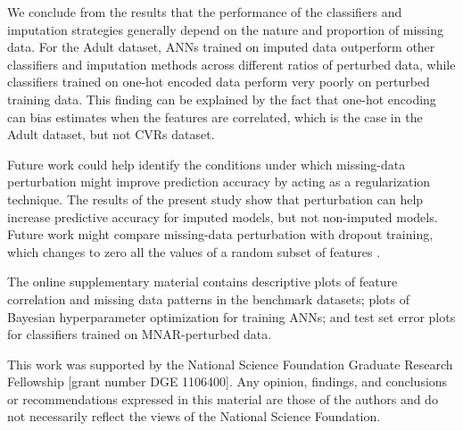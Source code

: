 \documentclass[10pt]{book}
\theoremstyle{definition}
\begin{document}
We conclude from the results that the performance of the classifiers and imputation strategies generally depend on the nature and proportion of missing data. For the Adult dataset, ANNs trained on imputed data outperform other classifiers and imputation methods across different ratios of perturbed data, while classifiers trained on one-hot encoded data perform very poorly on perturbed training data. This finding can be explained by the fact that one-hot encoding can bias estimates when the features are correlated, which is the case in the Adult dataset, but not CVRs dataset. 

Future work could help identify the conditions under which missing-data perturbation might improve prediction accuracy by acting as a regularization technique. The results of the present study show that perturbation can help increase predictive accuracy for imputed models, but not non-imputed models. Future work might compare missing-data perturbation with dropout training, which changes to zero all the values of a random subset of features \citep{hinton2012, maaten2013, wang2013}. 

\par
\vskip 14pt

The online supplementary material contains descriptive plots of feature correlation and missing data patterns in the benchmark datasets; plots of Bayesian hyperparameter optimization for training ANNs; and test set error plots for classifiers trained on MNAR-perturbed data. %

\par
\vskip 14pt

This work was supported by the National Science Foundation Graduate Research Fellowship [grant number DGE 1106400]. Any opinion, findings, and conclusions or recommendations expressed in this material are those of the authors and do not necessarily reflect the views of the National Science Foundation.
\par
\vskip 14pt
\end{document}
